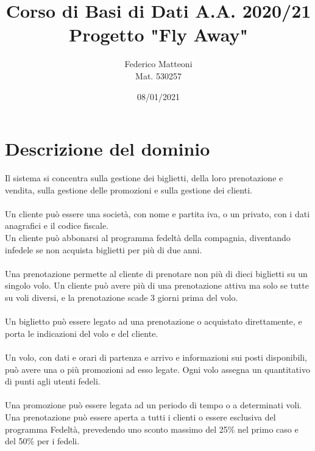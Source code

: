 \documentclass[10pt]{article}
\begin{document}
\renewcommand*\contentsname{Indice}
\title{Corso di Basi di Dati A.A. 2020/21\\Progetto "Fly Away"}
\author{Federico Matteoni\\Mat. 530257}
\date{08/01/2021}
\maketitle
\pagebreak
\section{Descrizione del dominio}
Il sistema si concentra sulla gestione dei biglietti, della loro prenotazione e vendita, sulla gestione delle promozioni e sulla gestione dei clienti.\\\\
Un cliente può essere una società, con nome e partita iva, o un privato, con i dati anagrafici e il codice fiscale.\\
Un cliente può abbonarsi al programma fedeltà della compagnia, diventando infedele se non acquista biglietti per più di due anni.\\\\
Una prenotazione permette al cliente di prenotare non più di dieci biglietti su un singolo volo. Un cliente può avere più di una prenotazione attiva ma solo se tutte su voli diversi, e la prenotazione scade 3 giorni prima del volo.\\\\Un biglietto può essere legato ad una prenotazione o acquistato direttamente, e porta le indicazioni del volo e del cliente.\\\\
Un volo, con dati e orari di partenza e arrivo e informazioni sui posti disponibili, può avere una o più promozioni ad esso legate. Ogni volo assegna un quantitativo di punti agli utenti fedeli.\\\\Una promozione può essere legata ad un periodo di tempo o a determinati voli. Una prenotazione può essere aperta a tutti i clienti o essere esclusiva del programma Fedeltà, prevedendo uno sconto massimo del 25\% nel primo caso e del 50\% per i fedeli.
\end{document}
